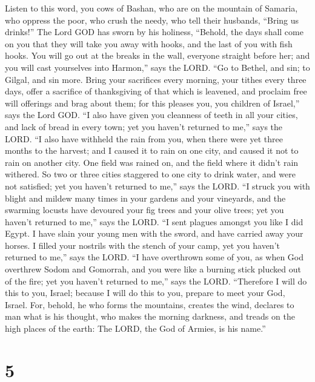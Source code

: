  Listen to this word, you cows of Bashan, who are on the
mountain of Samaria, who oppress the poor, who crush the needy, who tell
their husbands, ``Bring us drinks!''  The Lord GOD has
sworn by his holiness, ``Behold, the days shall come on you that they
will take you away with hooks, and the last of you with fish hooks.
 You will go out at the breaks in the wall, everyone
straight before her; and you will cast yourselves into Harmon,'' says
the LORD.  ``Go to Bethel, and sin; to Gilgal, and sin
more. Bring your sacrifices every morning, your tithes every three days,
 offer a sacrifice of thanksgiving of that which is
leavened, and proclaim free will offerings and brag about them; for this
pleases you, you children of Israel,'' says the Lord GOD. 
``I also have given you cleanness of teeth in all your cities, and lack
of bread in every town; yet you haven't returned to me,'' says the LORD.
 ``I also have withheld the rain from you, when there were
yet three months to the harvest; and I caused it to rain on one city,
and caused it not to rain on another city. One field was rained on, and
the field where it didn't rain withered.  So two or three
cities staggered to one city to drink water, and were not satisfied; yet
you haven't returned to me,'' says the LORD.  ``I struck
you with blight and mildew many times in your gardens and your
vineyards, and the swarming locusts have devoured your fig trees and
your olive trees; yet you haven't returned to me,'' says the LORD.
 ``I sent plagues amongst you like I did Egypt. I have
slain your young men with the sword, and have carried away your horses.
I filled your nostrils with the stench of your camp, yet you haven't
returned to me,'' says the LORD.  ``I have overthrown
some of you, as when God overthrew Sodom and Gomorrah, and you were like
a burning stick plucked out of the fire; yet you haven't returned to
me,'' says the LORD.  ``Therefore I will do this to you,
Israel; because I will do this to you, prepare to meet your God, Israel.
 For, behold, he who forms the mountains, creates the
wind, declares to man what is his thought, who makes the morning
darkness, and treads on the high places of the earth: The LORD, the God
of Armies, is his name.''

\hypertarget{section-4}{%
\section{5}\label{section-4}}

